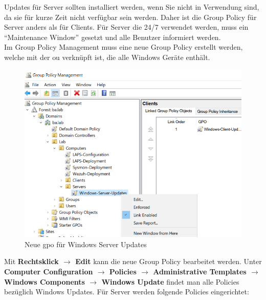 Updates für Server sollten installiert werden, wenn Sie nicht in Verwendung sind, da sie für kurze Zeit nicht verfügbar sein werden.
Daher ist die Group Policy für Server anders als für Clients.
Für Server die 24/7 verwendet werden, muss ein ``Maintenance Window'' gesetzt und alle Benutzer informiert werden.\\

Im Group Policy Management muss eine neue Group Policy erstellt werden, welche mit der \acrshort{ou} verknüpft ist, die alle Windows Geräte enthält.
\begin{figure}[H]
    \centering
    \includegraphics[width=0.7\linewidth]{../img/Updates/edit-gpo-server.png}
    \caption{Neue \acrshort{gpo} für Windows Server Updates}
\end{figure}

Mit \textbf{Rechtsklick $\rightarrow$ Edit} kann die neue Group Policy bearbeitet werden.
Unter \textbf{Computer Configuration $\rightarrow$ Policies $\rightarrow$ Administrative Templates $\rightarrow$ Windows Components $\rightarrow$ Windows Update} findet man alle Policies bezüglich Windows Updates.
Für Server werden folgende Policies eingerichtet:

